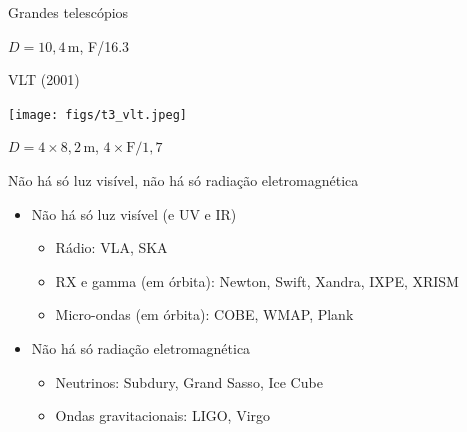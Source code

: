 \documentclass[beamer,9pt,aspectratio=169]{beamer}
\begin{document}
\begin{frame}{Grandes telescópios}
\begin{minipage}[t]{0.29\linewidth}
\begin{center}
      $D=10,4$\,m, F/16.3
    \end{center}
  \end{minipage}
  \begin{minipage}[t]{0.29\linewidth}
    \begin{center}
      VLT (2001)

      \texttt{[image: figs/t3\_vlt.jpeg]}

      $D=4\times8,2$\,m, $4\times\text{F}/1,7$
    \end{center}
  \end{minipage}
\end{frame}
\begin{frame}{Não há só luz visível, não há só radiação eletromagnética}
  \begin{itemize}
        \setlength{\itemsep}{2em}
    \item Não há só luz visível (e UV e IR)
      \vspace{0.75em}
      \begin{itemize}
        \setlength{\itemsep}{1em}
        \item Rádio: VLA, SKA
        \item RX e gamma (em órbita): Newton, Swift, Xandra, IXPE, XRISM
        \item Micro-ondas (em órbita): COBE, WMAP, Plank
      \end{itemize}
    \item Não há só radiação eletromagnética
      \vspace{0.75em}
      \begin{itemize}
        \setlength{\itemsep}{1em}
        \item Neutrinos: Subdury, Grand Sasso, Ice Cube
        \item Ondas gravitacionais: LIGO, Virgo
      \end{itemize}
  \end{itemize}
\end{frame}
\end{document}

